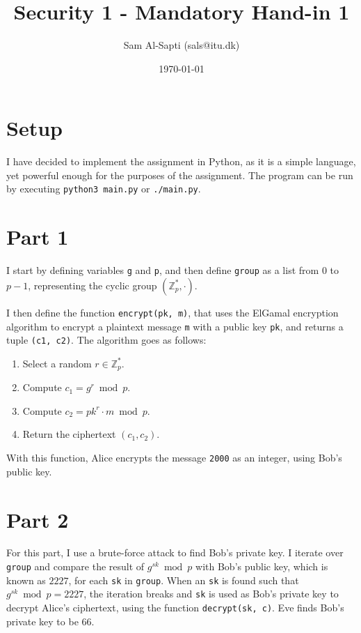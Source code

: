 \documentclass[12pt,a4paper]{article}
\title{Security 1 - Mandatory Hand-in 1}
\date{\today}
\author{Sam Al-Sapti (sals@itu.dk)}
\begin{document}
    \maketitle

    \section*{Setup}

    I have decided to implement the assignment in Python, as it is a simple
    language, yet powerful enough for the purposes of the assignment. The
    program can be run by executing \texttt{python3 main.py} or
    \texttt{./main.py}.
    
    \section*{Part 1}

    I start by defining variables \texttt{g} and \texttt{p}, and then define
    \texttt{group} as a list from $0$ to $p - 1$, representing the cyclic
    group $(\mathbb{Z}^*_p, \cdot)$.

    I then define the function \texttt{encrypt(pk, m)}, that uses the ElGamal
    encryption algorithm to encrypt a plaintext message \texttt{m} with a
    public key \texttt{pk}, and returns a tuple \texttt{(c1, c2)}. The
    algorithm goes as follows:

    \begin{enumerate}
        \item Select a random $r \in \mathbb{Z}^*_p$.
        \item Compute $c_1 = g^r \bmod p$.
        \item Compute $c_2 = {pk}^r \cdot m \bmod p$.
        \item Return the ciphertext $(c_1, c_2)$.
    \end{enumerate}

    With this function, Alice encrypts the message \texttt{2000} as an
    integer, using Bob's public key.

    \section*{Part 2}

    For this part, I use a brute-force attack to find Bob's private key. I
    iterate over \texttt{group} and compare the result of $g^{sk} \bmod p$
    with Bob's public key, which is known as $2227$, for each \texttt{sk} in
    \texttt{group}. When an \texttt{sk} is found such that $g^{sk} \bmod p =
    2227$, the iteration breaks and \texttt{sk} is used as Bob's private key
    to decrypt Alice's ciphertext, using the function \texttt{decrypt(sk, c)}.
    Eve finds Bob's private key to be $66$.
\end{document}
